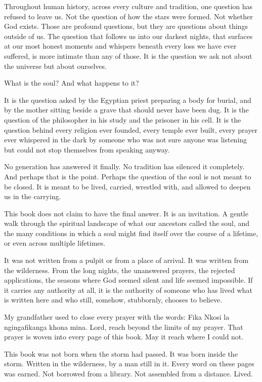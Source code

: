 Throughout human history, across every culture and tradition, one
question has refused to leave us. Not the question of how the stars were
formed. Not whether God exists. Those are profound questions, but they
are questions about things outside of us. The question that follows us
into our darkest nights, that surfaces at our most honest moments and
whispers beneath every loss we have ever suffered, is more intimate than
any of those. It is the question we ask not about the universe but about
ourselves.

What is the soul? And what happens to it?

It is the question asked by the Egyptian priest preparing a body for
burial, and by the mother sitting beside a grave that should never have
been dug. It is the question of the philosopher in his study and the
prisoner in his cell. It is the question behind every religion ever
founded, every temple ever built, every prayer ever whispered in the
dark by someone who was not sure anyone was listening but could not stop
themselves from speaking anyway.

No generation has answered it finally. No tradition has silenced it
completely. And perhaps that is the point. Perhaps the question of the
soul is not meant to be closed. It is meant to be lived, carried,
wrestled with, and allowed to deepen us in the carrying.

This book does not claim to have the final answer. It is an invitation.
A gentle walk through the spiritual landscape of what our ancestors
called the soul, and the many conditions in which a soul might find
itself over the course of a lifetime, or even across multiple lifetimes.

It was not written from a pulpit or from a place of arrival. It was
written from the wilderness. From the long nights, the unanswered
prayers, the rejected applications, the seasons where God seemed silent
and life seemed impossible. If it carries any authority at all, it is
the authority of someone who has lived what is written here and who
still, somehow, stubbornly, chooses to believe.

My grandfather used to close every prayer with the words: Fika Nkosi la
ngingafikanga khona mina. Lord, reach beyond the limits of my prayer.
That prayer is woven into every page of this book. May it reach where I
could not.

This book was not born when the storm had passed. It was born inside the
storm. Written in the wilderness, by a man still in it. Every word on
these pages was earned. Not borrowed from a library. Not assembled from
a distance. Lived.

